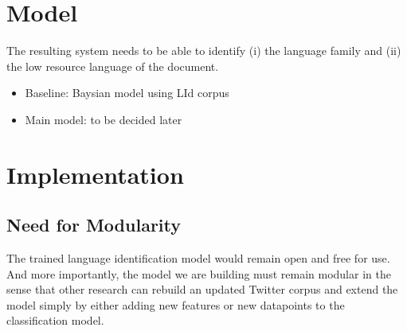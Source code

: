 \documentclass[11pt]{article}
\begin{document}
\section{Model}

The resulting system needs to be able to identify (i) the language family and (ii) the low resource language of the document.

\begin{itemize}
\item Baseline: Baysian model using LId corpus
\item Main model: to be decided later
\end{itemize}

\section{Implementation}

\subsection{Need for Modularity}

The trained language identification model would remain open and free for use. And more importantly, the model we are building must remain modular in the sense that other research can rebuild an updated Twitter corpus and extend the model simply by either adding new features or new datapoints to the classification model.

\
\
\
\
\

{}

\end{document}
